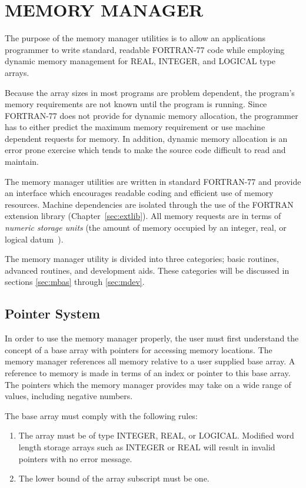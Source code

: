 \chapter{MEMORY MANAGER}
The purpose of the memory manager utilities is to allow an applications
programmer to write standard, readable FORTRAN-77 code while employing
dynamic memory management for REAL, INTEGER, and LOGICAL type arrays.

Because the array sizes in most programs are problem dependent, the
program's memory requirements are not known until the program is running.
Since FORTRAN-77 does not provide for dynamic memory allocation, the
programmer has to either predict the maximum memory requirement or use
machine dependent requests for memory.  In addition, dynamic memory
allocation is an error prone exercise which tends to make the source code
difficult to read and maintain.

The memory manager utilities are written in standard FORTRAN-77 and provide
an interface which encourages readable coding and efficient use of memory
resources.  Machine dependencies are isolated through the use of the FORTRAN
extension library (Chapter~\ref{sec:extlib}). All memory requests are in
terms of {\em numeric storage units} (the amount of memory occupied by an
integer, real, or logical datum~\cite{ansi}). 

The memory manager utility is divided into three categories; basic routines,
advanced routines, and development aids.  These categories will be discussed
in sections \ref{sec:mbas} through \ref{sec:mdev}.


\section{Pointer System}
In order to use the memory manager properly, the user must first understand
the concept of a base array with pointers for accessing memory locations.
The memory manager references all memory relative to a user supplied base
array.  A reference to memory is made in terms of an index or pointer to
this base array.  The pointers which the memory manager provides may take on
a wide range of values, including negative numbers.

The base array must comply with the following rules:
\begin{enumerate}
\item The array must be of type INTEGER, REAL, or LOGICAL.  Modified word
length storage arrays such as INTEGER or REAL will result in
invalid pointers with no error message. 

\item The lower bound of the array subscript must be one.
\end{enumerate}

